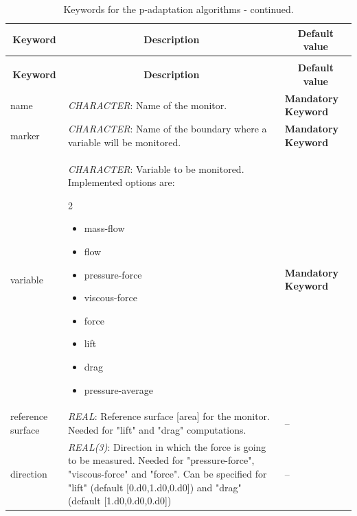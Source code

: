 \documentclass[a4paper,10pt]{report}
\begin{document}
\begin{longtable}{|p{4cm}|p{10cm}|p{2.2cm}|}
\caption{Keywords for probes.} \label{tab:SurfaceMonitorKey} \\
\hline
\multicolumn{1}{|c|}{\textbf{Keyword}} & \multicolumn{1}{c|}{\textbf{Description}} & \multicolumn{1}{c|}{\textbf{Default value}} \\ \hline
\endfirsthead

\caption{Keywords for the p-adaptation algorithms - continued.} \\
\hline
\multicolumn{1}{|c|}{\textbf{Keyword}} & \multicolumn{1}{c|}{\textbf{Description}} & \multicolumn{1}{c|}{\textbf{Default value}} \\ \hline
\endhead

name 	& 
			\textit{CHARACTER}: Name of the monitor. & 
							\textbf{Mandatory Keyword} \\ \hline
							
marker & 
			\textit{CHARACTER}: Name of the boundary where a variable will be monitored. & 
							\textbf{Mandatory Keyword} \\ \hline

variable 	& 
			\textit{CHARACTER}: Variable to be monitored. Implemented options are:\
\begin{multicols}{2}
\begin{itemize}
\item mass-flow
\item flow
\item pressure-force
\item viscous-force
\item force
\item lift
\item drag
\item pressure-average
\end{itemize}			
\end{multicols}	
			 & 
							\textbf{Mandatory Keyword} \\ \hline

reference surface 	& 
			\textit{REAL}: Reference surface [area] for the monitor. Needed for "lift" and "drag" computations. & 
							-- \\ \hline

direction 	& 
			\textit{REAL(3)}: Direction in which the force is going to be measured. Needed for "pressure-force", "viscous-force" and "force". Can be specified for "lift" (default [0.d0,1.d0,0.d0]) and "drag" (default [1.d0,0.d0,0.d0])   & 
							-- \\ \hline
\end{longtable}
\end{document}
